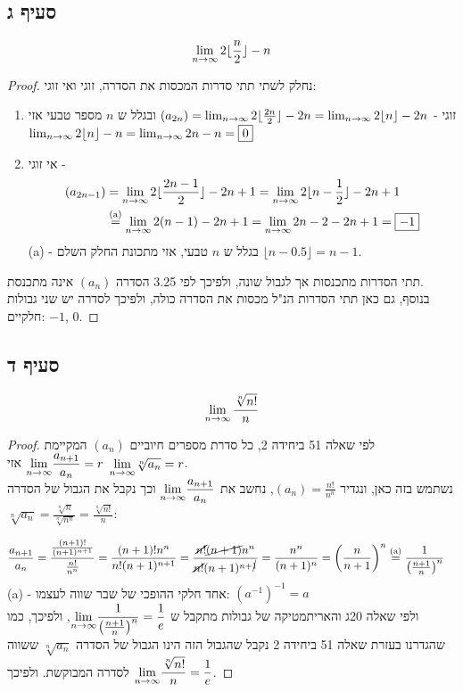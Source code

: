 \documentclass{article}
\begin{document}
	\pagebreak
	\subsection*{סעיף ג}
	\[
	\lim_{n \to \infty} 2 \lfloor \frac{n}{2}\rfloor - n
	\]
	\begin{proof}
		נחלק לשתי תתי סדרות המכסות את הסדרה, זוגי ואי זוגי:
		\begin{enumerate}
			\item זוגי - $(a_{2n}) = \lim_{n \to \infty} 2 \lfloor \frac{2n}{2}\rfloor - 2n =
			\lim_{n \to \infty} 2 \lfloor n\rfloor - 2n$
			ובגלל ש $n$ מספר טבעי אזי
			$\lim_{n \to \infty} 2 \lfloor n\rfloor - n = \lim_{n \to \infty} 2n - n = \boxed{0}$
			\item אי זוגי -
			\begin{align*}
				(a_{2n-1}) &= \lim_{n \to \infty} 2\lfloor \frac{2n-1}{2} \rfloor - 2n + 1 =
				\lim_{n \to \infty} 2\lfloor n - \frac{1}{2} \rfloor - 2n + 1 \\
				&\overset{\text{(a)}}= \lim_{n \to \infty} 2(n-1) - 2n + 1 =
				\lim_{n \to \infty} 2n - 2 - 2n + 1 = \boxed{-1}
			\end{align*}
			(a) - בגלל ש $n$ טבעי, אזי מתכונת החלק השלם $\lfloor n - 0.5 \rfloor = n - 1$.
		\end{enumerate}
		תתי הסדרות מתכנסות אך לגבול שונה, ולפיכך לפי 3.25 הסדרה $(a_n)$ אינה מתכנסת. \\
		בנוסף, גם כאן תתי הסדרות הנ"ל מכסות את הסדרה כולה, ולפיכך לסדרה יש שני גבולות חלקיים: $-1$, $0$.
	\end{proof}

	\subsection*{סעיף ד}
	\[ \lim_{n \to \infty} \frac{\sqrt[n]{n!}}{n} \]
	\begin{proof}
	לפי שאלה 51 ביחידה 2, כל סדרת מספרים חיוביים $(a_n)$ המקיימת $\displaystyle{\lim_{n \to \infty}} \frac{a_{n+1}}{a_n} = r$ אזי $\displaystyle{\lim_{n \to \infty}} \sqrt[n]{a_n} = r$. \\
	נשתמש בזה כאן, ונגדיר $(a_n) = \frac{n!}{n^n}$, נחשב את $\displaystyle{\lim_{n \to \infty}} \frac{a_{n+1}}{a_n}$ וכך נקבל את הגבול של הסדרה $\sqrt[n]{a_n} = \frac{\sqrt[n]{n}}{\sqrt[n]{n^n}} = \frac{\sqrt[n]{n!}}{n}$:

	\begin{align*}
		\frac{a_{n+1}}{a_n} &=
		\frac{\frac{(n+1)!}{(n+1)^{n+1}}}{\frac{n!}{n^n}} =
		\frac{(n+1)!n^n}{n!(n+1)^{n+1}} =
		\frac{\cancel{n!}\cancel{(n+1)}n^n}{\cancel{n!}(n+1)^{n + \cancel{1}}}
		=
		\frac{n^n}{(n+1)^n} =
		\left(\frac{n}{n+1}\right)^n \overset{\text{(a)}}=
		\frac{1}{\left( \frac{n+1}{n} \right)^n}
	\end{align*}
	(a) - אחד חלקי ההופכי של שבר שווה לעצמו: $(a^{-1})^{-1} = a$ \\
	ולפי שאלה 20ג והאריתמטיקה של גבולות מתקבל ש $\displaystyle{\lim_{n \to \infty}} \frac{1}{\left( \frac{n+1}{n} \right)^n} = \frac{1}{e}$,
	 ולפיכך, כמו שהגדרנו בעזרת שאלה 51 ביחידה 2 נקבל שהגבול הזה הינו הגבול של הסדרה $\sqrt[n]{a_n}$ ששווה לסדרה המבוקשת.
	ולפיכך $\displaystyle{\lim_{n \to \infty}} \frac{\sqrt[n]{n!}}{n} = \frac{1}{e}$.
	\end{proof}
\end{document}
